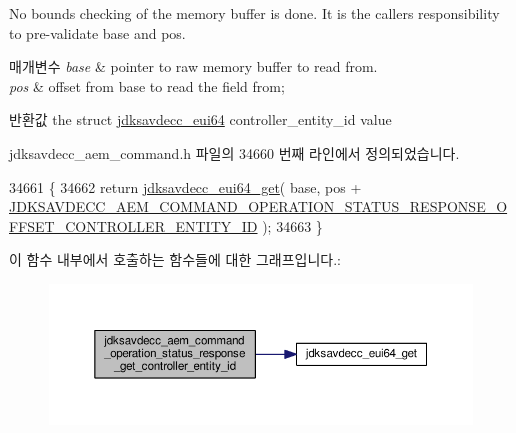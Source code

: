 No bounds checking of the memory buffer is done. It is the caller\textquotesingle{}s responsibility to pre-\/validate base and pos.


\begin{DoxyParams}{매개변수}
{\em base} & pointer to raw memory buffer to read from. \\
\hline
{\em pos} & offset from base to read the field from; \\
\hline
\end{DoxyParams}
\begin{DoxyReturn}{반환값}
the struct \hyperlink{structjdksavdecc__eui64}{jdksavdecc\+\_\+eui64} controller\+\_\+entity\+\_\+id value 
\end{DoxyReturn}


jdksavdecc\+\_\+aem\+\_\+command.\+h 파일의 34660 번째 라인에서 정의되었습니다.


\begin{DoxyCode}
34661 \{
34662     \textcolor{keywordflow}{return} \hyperlink{group__eui64_ga2652311a25a6b91cddbed75c108c7031}{jdksavdecc\_eui64\_get}( base, pos + 
      \hyperlink{group__command__operation__status__response_ga7ae2781500733544ae98e74ad76cddd2}{JDKSAVDECC\_AEM\_COMMAND\_OPERATION\_STATUS\_RESPONSE\_OFFSET\_CONTROLLER\_ENTITY\_ID}
       );
34663 \}
\end{DoxyCode}


이 함수 내부에서 호출하는 함수들에 대한 그래프입니다.\+:
\nopagebreak
\begin{figure}[H]
\begin{center}
\leavevmode
\includegraphics[width=350pt]{group__command__operation__status__response_ga51b9b62a42fcbc86813666a29214913b_cgraph}
\end{center}
\end{figure}


